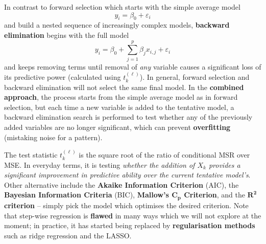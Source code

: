 In contrast to forward selection which starts with the simple average model $$y_{i}=\beta_{0}+\varepsilon_{i}$$ and build a nested sequence of increasingly complex models, \textbf{backward elimination} begins with the full model $${y}_{i}=\beta_{0}+\sum_{j=1}^{p}\beta_{j}x_{i,j}+\varepsilon_{i}$$ and keeps removing terms until removal of \textit{any} variable causes a significant loss of its predictive power (calculated using $t^{(\ell)}_{k}$). In general, forward selection and backward elimination will not select the same final model. 
\newpage\noindent
In the \textbf{combined approach}, the process starts from the simple average model as in forward selection, but each time a new variable is added to the tentative model, a backward elimination search is performed to test whether any of the previously added variables are no longer significant, which can prevent \textbf{overfitting} (mistaking noise for a pattern). 
\par The test statistic $t^{(\ell)}_{k}$ is the square root of the ratio of conditional MSR over MSE. In everyday terms, it is testing \textit{whether the addition of $X_{k}$ provides a significant improvement in predictive ability over the current tentative model's}. Other alternative include the \textbf{Akaike Information Criterion} (AIC), the \textbf{Bayesian Information Criteria} (BIC), \textbf{Mallow's $\bm{C_{p}}$ Criterion}, and the \textbf{$\bm{R^2}$ criterion} -- simply pick the model which optimises the desired criterion. \newl Note that step-wise regression is \textbf{flawed} in many ways which we will not explore at the moment; in practice, it has  started being replaced by \textbf{regularisation methods} such as ridge regression and the LASSO.
